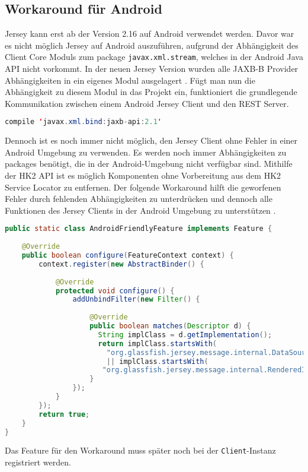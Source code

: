 \subsection{Workaround für Android}
Jersey kann erst ab der Version 2.16 auf Android verwendet werden. Davor war es nicht möglich Jersey auf Android auszuführen, aufgrund der Abhängigkeit des Client Core Moduls zum package \texttt{javax.xml.stream}, welches in der Android Java API nicht vorkommt. In der neuen Jersey Version wurden alle JAXB-B Provider Abhängigkeiten in ein eigenes Modul ausgelagert \cite{jerseyAndroid:podlesak}. Fügt man nun die Abhängigkeit zu diesem Modul in das Projekt ein, funktioniert die grundlegende Kommunikation zwischen einem Android Jersey Client und den REST Server. 

\begin{lstlisting}[language=java]
compile 'javax.xml.bind:jaxb-api:2.1'
\end{lstlisting}
 
Dennoch ist es noch immer nicht möglich, den Jersey Client ohne Fehler in einer Android Umgebung zu verwenden. Es werden noch immer Abhängigkeiten zu packages benötigt, die in der Android-Umgebung nicht verfügbar sind. Mithilfe der HK2 API ist es möglich Komponenten ohne Vorbereitung aus dem HK2 Service Locator zu entfernen. Der folgende Workaround hilft die geworfenen Fehler durch fehlenden Abhängigkeiten zu unterdrücken und dennoch alle Funktionen des Jersey Clients in der Android Umgebung zu unterstützen \cite{jerseyAndroid2:podlesak}.

\begin{lstlisting}[language=java, caption={Workaround Jersey Client auf Android},label={lst:jerseyAndroid }, escapechar=|, frame=single]
public static class AndroidFriendlyFeature implements Feature {
	
	@Override
	public boolean configure(FeatureContext context) {
		context.register(new AbstractBinder() {
		
			@Override
			protected void configure() {
				addUnbindFilter(new Filter() {
				
					@Override
					public boolean matches(Descriptor d) {
					  String implClass = d.getImplementation();
					  return implClass.startsWith(
						"org.glassfish.jersey.message.internal.DataSource")
						|| implClass.startsWith(
					   "org.glassfish.jersey.message.internal.RenderedImage");
					}
				});
			}
		});
		return true;
	}
}
\end{lstlisting}

Das Feature für den Workaround muss später noch bei der \texttt{Client}-Instanz registriert werden.

